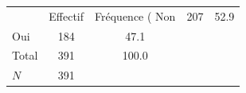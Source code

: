 {
\def\sym#1{\ifmmode^{#1}\else\(^{#1}\)\fi}
\begin{tabular}{l*{1}{cc}}
\toprule
            &    Effectif&Fréquence (%
\midrule
Non         &         207&        52.9\\
Oui         &         184&        47.1\\
Total       &         391&       100.0\\
\midrule
\(N\)       &         391&            \\
\bottomrule
\end{tabular}
}
